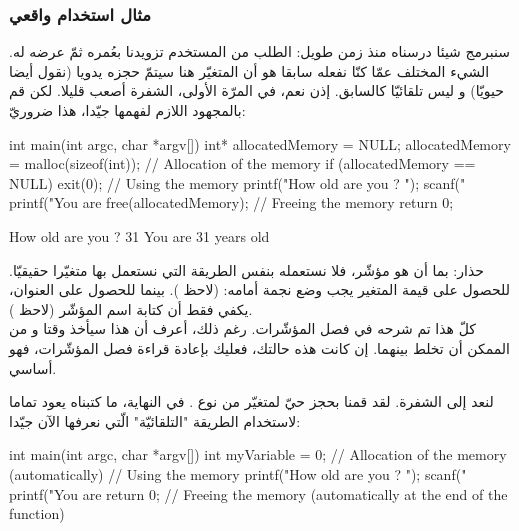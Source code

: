 \subsubsection{مثال استخدام واقعي}

سنبرمج شيئا درسناه منذ زمن طويل: الطلب من المستخدم تزويدنا بعُمره ثمّ عرضه له. الشيء المختلف عمّا كنّا نفعله سابقا هو أن المتغيّر هنا سيتمّ حجزه يدويا (نقول أيضا حيويّا) و ليس تلقائيّا كالسابق. إذن نعم، في المرّة الأولى، الشفرة أصعب قليلا. لكن قم بالمجهود اللازم لفهمها جيّدا، هذا ضروريّ:

\begin{Csource}
int main(int argc, char *argv[])
{
	int* allocatedMemory = NULL;
	allocatedMemory = malloc(sizeof(int)); // Allocation of the memory
	if (allocatedMemory == NULL)
	{
		exit(0);
	}
	// Using the memory
	printf("How old are you ? ");
	scanf("%
	printf("You are %
	free(allocatedMemory); // Freeing the memory
	 return 0;
}
\end{Csource}

\begin{Console}
How old are you  ? 31
You are 31 years old
\end{Console}

\begin{warning}
حذار: بما أن
هو مؤشّر، فلا نستعمله بنفس الطريقة التي نستعمل بها متغيّرا حقيقيّا. للحصول على قيمة المتغير يجب وضع نجمة أمامه:
(لاحظ
).
بينما للحصول على العنوان، يكفي فقط أن كتابة اسم المؤشّر
(لاحظ
).\\
كلّ هذا تم شرحه في فصل المؤشّرات. رغم ذلك، أعرف أن هذا سيأخذ وقتا و من الممكن أن تخلط بينهما. إن كانت هذه حالتك، فعليك بإعادة قراءة فصل المؤشّرات، فهو أساسي.
\end{warning}

لنعد إلى الشفرة. لقد قمنا بحجز حيّ لمتغيّر من نوع
.
في النهاية، ما كتبناه يعود تماما لاستخدام الطريقة
"التلقائيّة" الّتي نعرفها الآن جيّدا:

\begin{Csource}
int main(int argc, char *argv[])
{
	int myVariable = 0; // Allocation of the memory (automatically)
	// Using the memory
	printf("How old are you ? ");
	scanf("%
	printf("You are %
	return 0;
} // Freeing the memory (automatically at the end of the function)
\end{Csource}

